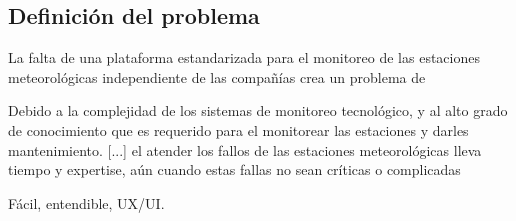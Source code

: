 \subsection{Definición del problema}

La falta de una plataforma estandarizada para el monitoreo de las estaciones meteorológicas independiente de las compañías crea un problema de
\cite{muller_sensors_and_the_city}

Debido a la complejidad de los sistemas de monitoreo tecnológico, y al alto grado de conocimiento que es requerido para el monitorear las estaciones y darles mantenimiento. [...] el atender los fallos de las estaciones meteorológicas lleva tiempo y expertise, aún cuando estas fallas no sean críticas o complicadas

\cite{red_climatologica_uacj}

Fácil, entendible, UX/UI.

